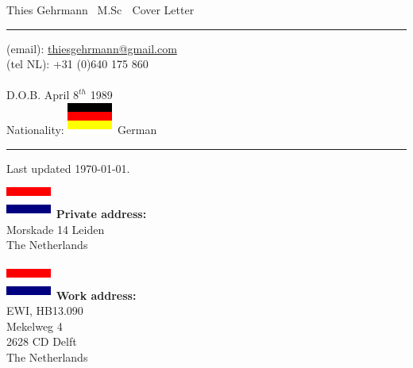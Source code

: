 \documentclass[letterpaper, 10pt]{article} %
\def\doctitle{\color{BrickRed}Cover Letter}
\def\name{\color{MidnightBlue}Thies Gehrmann}
\def\maxdeg{\color{Black}M.Sc}
\begin{document}
\small

\pagestyle{plain}

\label{top}

{\huge {\textbf \name} {\footnotesize $\,$ \maxdeg} $\;$ {\textbf \doctitle} }
\vspace{0.1cm}
\hrule
\vspace{0.5cm}


\begin{minipage}[t]{0.50\textwidth}
  (email): \href{mailto:thiesgehrmann@gmail.com}{thiesgehrmann@gmail.com} \\
  (tel NL): +31 (0)640 175 860     \\
  \\
  D.O.B. April $8^{th}$ 1989 \\
  Nationality: \includegraphics[scale=0.4]{de.eps} German\\
  \hrule
  \vspace{5pt}

  Last updated \today.

\end{minipage}
\hfill
\begin{minipage}[t]{0.30\textwidth}
  \includegraphics[scale=0.4]{nl.eps}
  \textbf{Private address:} \\
  Morskade 14 Leiden \\
  The Netherlands \\
  \\
  \includegraphics[scale=0.4]{nl.eps}
  \textbf{Work address:} \\
  EWI, HB13.090 \\
  Mekelweg 4\\
  2628 CD Delft \\
  The Netherlands \\
\\
\end{minipage}
\end{document}
